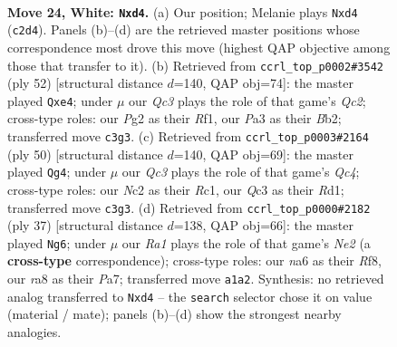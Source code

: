 \documentclass[11pt]{article}
\begin{document}
\clearpage

\begin{figure}[p]\centering
\begin{subfigure}{0.46\textwidth}\centering
\resizebox{\linewidth}{!}{%
\newchessgame
\chessboard[
  setfen={r1b2k2/pp3pp1/n3pq2/3p4/3nr3/PPQ5/2N3PP/R2K2NR w - - 4 24},
  showmover=false,
  pgfstyle=straightmove, color=movearrow, markmove={c2-d4}
]}
\caption{}
\end{subfigure}\hfill
\begin{subfigure}{0.46\textwidth}\centering
\resizebox{\linewidth}{!}{%
\newchessgame
\chessboard[
  setfen={4r1k1/2b2p1p/4q1p1/p1r1n3/4n3/2N1P1P1/1BQ2P1P/3R1RK1 w - - 0 27},
  showmover=false,
  pgfstyle=straightmove, color=movearrow, markmove={c2-e4}
]}
\caption{}
\end{subfigure}
\\[4pt]
\begin{subfigure}{0.46\textwidth}\centering
\resizebox{\linewidth}{!}{%
\newchessgame
\chessboard[
  setfen={2rr2k1/pq4pp/1p2p3/1NbnN3/2Q5/1P2P3/P4P1P/2RR2K1 w - - 0 26},
  showmover=false,
  pgfstyle=straightmove, color=movearrow, markmove={c4-g4}
]}
\caption{}
\end{subfigure}\hfill
\begin{subfigure}{0.46\textwidth}\centering
\resizebox{\linewidth}{!}{%
\newchessgame
\chessboard[
  setfen={3r1rk1/pp2n1p1/2q1p2p/8/3nN3/P2Q3N/1PP2PPP/2R2R1K b - - 13 19},
  showmover=false,
  pgfstyle=straightmove, color=movearrow, markmove={e7-g6}
]}
\caption{}
\end{subfigure}
\caption{\textbf{Move 24, White: \texttt{Nxd4}.} (a) Our position; Melanie plays \texttt{Nxd4} (\texttt{c2d4}). Panels (b)--(d) are the retrieved master positions whose correspondence most drove this move (highest QAP objective among those that transfer to it). (b) Retrieved from \texttt{ccrl\_top\_p0002\#3542} (ply 52) [structural distance $d$=140, QAP obj=74]: the master played \texttt{Qxe4}; under $\mu$ our \emph{Qc3} plays the role of that game's \emph{Qc2}; cross-type roles: our \emph{P}g2 as their \emph{R}f1, our \emph{P}a3 as their \emph{B}b2; transferred move \texttt{c3g3}. (c) Retrieved from \texttt{ccrl\_top\_p0003\#2164} (ply 50) [structural distance $d$=140, QAP obj=69]: the master played \texttt{Qg4}; under $\mu$ our \emph{Qc3} plays the role of that game's \emph{Qc4}; cross-type roles: our \emph{N}c2 as their \emph{R}c1, our \emph{Q}c3 as their \emph{R}d1; transferred move \texttt{c3g3}. (d) Retrieved from \texttt{ccrl\_top\_p0000\#2182} (ply 37) [structural distance $d$=138, QAP obj=66]: the master played \texttt{Ng6}; under $\mu$ our \emph{Ra1} plays the role of that game's \emph{Ne2} (a \textbf{cross-type} correspondence); cross-type roles: our \emph{n}a6 as their \emph{R}f8, our \emph{r}a8 as their \emph{P}a7; transferred move \texttt{a1a2}. Synthesis: no retrieved analog transferred to \texttt{Nxd4} -- the \texttt{search} selector chose it on value (material / mate); panels (b)--(d) show the strongest nearby analogies.}
\label{fig:thought-m46}
\end{figure}
\end{document}
